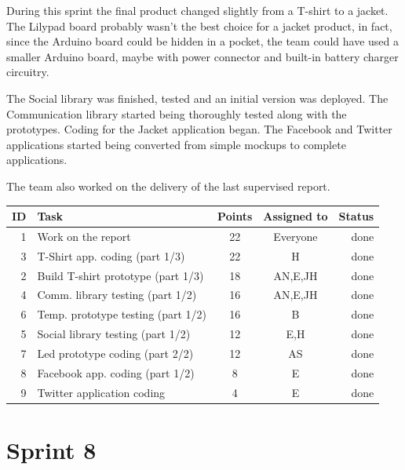 During this sprint the final product changed slightly from a T-shirt to a jacket.
The Lilypad board probably wasn't the best choice for a jacket product, in fact,
since the Arduino board could be hidden in a pocket, the team could have used
a smaller Arduino board, maybe with power connector and built-in battery
charger circuitry.

The Social library was finished, tested and an initial version was deployed.
The Communication library started being thoroughly tested along with the prototypes.
Coding for the Jacket application began. The Facebook and Twitter applications
started being converted from simple mockups to complete applications.

The team also worked on the delivery of the last supervised report.

\begin{table}[ht!]
\begin{tabular}{ | r | l | c | c | r | }

\hline
\textbf{ID} & \textbf{Task} & \textbf{Points} & \textbf{Assigned to} & \textbf{Status} \\
\hline

1 & Work on the report							& 22 & Everyone		& done \\
\hline
3 & T-Shirt app. coding (part 1/3)				& 22 & H			& done \\
\hline
2 & Build T-shirt prototype (part 1/3)			& 18 & AN,E,JH		& done \\
\hline
4 & Comm. library testing (part 1/2)			& 16 & AN,E,JH		& done \\
\hline
6 & Temp. prototype testing (part 1/2)			& 16 & B			& done \\
\hline
5 & Social library testing (part 1/2)			& 12 & E,H			& done \\
\hline
7 & Led prototype coding (part 2/2)				& 12 & AS			& done \\
\hline
8 & Facebook app. coding (part 1/2)				& 8  & E			& done \\
\hline
9 & Twitter application coding					& 4  & E			& done \\
\hline

\end{tabular}
\end{table}

\newpage

\section{Sprint 8}

